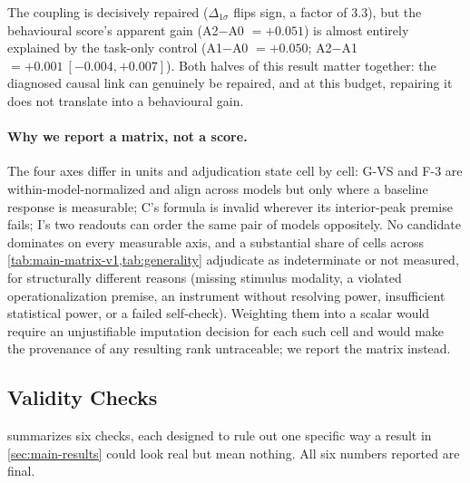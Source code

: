 The coupling is decisively repaired ($\Delta_{1\sigma}$ flips sign, a factor of 3.3), but
the behavioural score's apparent gain (A2$-$A0 $=+0.051$) is almost entirely explained by
the task-only control (A1$-$A0 $=+0.050$; A2$-$A1 $=+0.001\ [-0.004,+0.007]$). Both halves
of this result matter together: the diagnosed causal link can genuinely be repaired, and
at this budget, repairing it does not translate into a behavioural gain.

\paragraph{Why we report a matrix, not a score.} The four axes differ in units and
adjudication state cell by cell: G-VS and F-3 are within-model-normalized and align
across models but only where a baseline response is measurable; C's formula is invalid
wherever its interior-peak premise fails; I's two readouts can order the same pair of
models oppositely. No candidate dominates on every measurable axis, and a substantial
share of cells across \cref{tab:main-matrix-v1,tab:generality} adjudicate as
indeterminate or not measured, for structurally different reasons (missing stimulus
modality, a violated operationalization premise, an instrument without resolving power,
insufficient statistical power, or a failed self-check). Weighting them into a scalar
would require an unjustifiable imputation decision for each such cell and would make the
provenance of any resulting rank untraceable; we report the matrix instead.

\subsection{Validity Checks}
\label{sec:ablation}

 summarizes six checks, each designed to rule out one specific way a
result in \cref{sec:main-results} could look real but mean nothing. All six numbers
reported are final.

